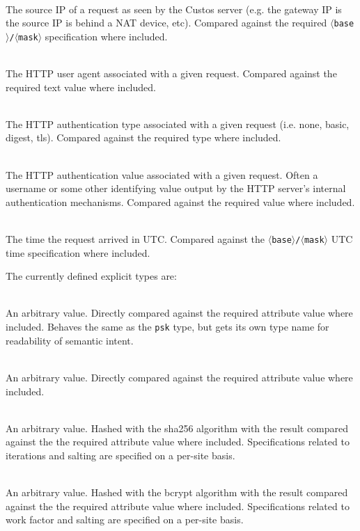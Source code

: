 \begin{packed_desc}
\item[\texttt{ip\_src}] \hfill \\ The source IP of a request as seen
  by the Custos server (e.g. the gateway IP is the source IP is behind
  a NAT device, etc). Compared against the required
  \texttt{$\langle$base$\rangle$/$\langle$mask$\rangle$} specification where
  included.
\item[\texttt{user\_agent}] \hfill \\ The HTTP user agent
  associated with a given request. Compared against the required text
  value where included.
\item[\texttt{auth\_type}] \hfill \\ The HTTP authentication type
  associated with a given request (i.e. none, basic, digest,
  tls). Compared against the required type where included.
\item[\texttt{auth\_value}] \hfill \\ The HTTP authentication value
  associated with a given request. Often a username or some other
  identifying value output by the HTTP server's internal
  authentication mechanisms. Compared against the required value where
  included.
\item[\texttt{time\_utc}] \hfill \\ The time the request arrived in
  UTC. Compared against the
  \texttt{$\langle$base$\rangle$/$\langle$mask$\rangle$} UTC time
  specification where included.
\end{packed_desc}

\noindent
The currently defined explicit types are:

\begin{packed_desc}
\item[\texttt{user\_id}] \hfill \\ An arbitrary value. Directly
  compared against the required attribute value where
  included. Behaves the same as the \texttt{psk} type, but gets its
  own type name for readability of semantic intent.
\item[\texttt{psk}] \hfill \\ An arbitrary value. Directly
  compared against the required attribute value where included.
\item[\texttt{psk\_sha256}] \hfill \\ An arbitrary value. Hashed with
  the sha256 algorithm with the result compared against the the
  required attribute value where included. Specifications related to
  iterations and salting are specified on a per-site basis.
\item[\texttt{psk\_bcrypt}] \hfill \\ An arbitrary value. Hashed with
  the bcrypt algorithm with the result compared against the the
  required attribute value where included. Specifications related to
  work factor and salting are specified on a per-site basis.
\end{packed_desc}


